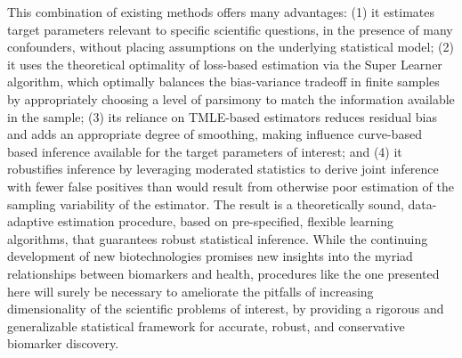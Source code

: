 This combination of existing methods offers many advantages: (1) it estimates
target parameters relevant to specific scientific questions, in the presence of
many confounders, without placing assumptions on the underlying statistical
model; (2) it uses the theoretical optimality of loss-based estimation via the
Super Learner algorithm, which optimally balances the bias-variance tradeoff in
finite samples by appropriately choosing a level of parsimony to match the
information available in the sample; (3) its reliance on TMLE-based estimators
reduces residual bias and adds an appropriate degree of smoothing, making
influence curve-based based inference available for the target parameters of
interest; and (4) it robustifies inference by leveraging  moderated statistics
to derive joint inference with fewer false positives than would result from
otherwise poor estimation of the sampling variability of the estimator. The
result is a theoretically sound, data-adaptive estimation procedure, based on
pre-specified, flexible learning algorithms, that guarantees robust statistical
inference. While the continuing development of new biotechnologies promises new
insights into the myriad relationships between biomarkers and health,
procedures like the one presented here will surely be necessary to ameliorate
the pitfalls of increasing dimensionality of the scientific problems of
interest, by providing a rigorous and generalizable statistical framework for
accurate, robust, and conservative biomarker discovery.
